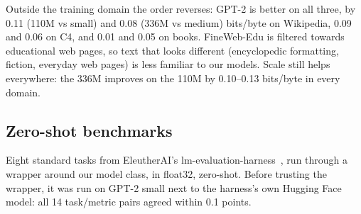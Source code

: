 \documentclass[11pt]{article}
\begin{document}
Outside the training domain the order reverses: GPT-2 is better on all three, by 0.11 (110M vs small) and 0.08 (336M vs medium) bits/\allowbreak{}byte on Wikipedia, 0.09 and 0.06 on C4, and 0.01 and 0.05 on books. FineWeb-Edu is filtered towards educational web pages, so text that looks different (encyclopedic formatting, fiction, everyday web pages) is less familiar to our models. Scale still helps everywhere: the 336M improves on the 110M by 0.10–0.13 bits/\allowbreak{}byte in every domain.

\subsection{Zero-shot benchmarks}

Eight standard tasks from EleutherAI's lm-evaluation-harness~\citep{eval-harness}, run through a wrapper around our model class, in float32, zero-shot. Before trusting the wrapper, it was run on GPT-2 small next to the harness's own Hugging Face model: all 14 task/\allowbreak{}metric pairs agreed within 0.1 points.
\end{document}
